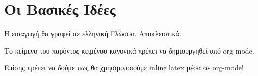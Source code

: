 \section{Οι Βασικές Ιδέες}
Η εισαγωγή θα γραφεί σε ελληνική Γλώσσα. Αποκλειστικά.

Το κείμενο του παρόντος κειμένου κανονικά πρέπει να δημιουργηθεί από org-mode.

Επίσης πρέπει να δούμε πως θα χρησιμοποιούμε inline latex μέσα σε org-mode!
